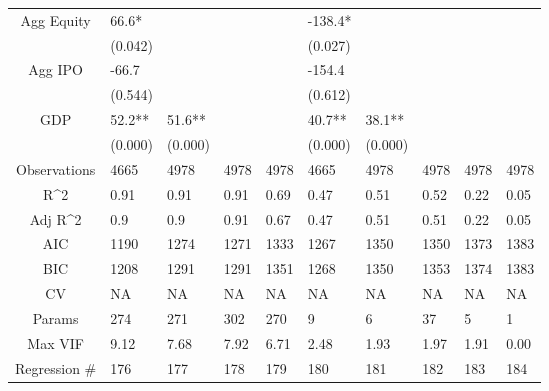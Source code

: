 \documentclass{article}
\begin{document}
\begin{table}[H]
\begin{tabular}{|clllllllll|}
  Agg Equity & 66.6* &  &  &  & -138.4* &  &  &  &  \\
   & (0.042) &  &  &  & (0.027) &  &  &  &  \\
  Agg IPO & -66.7 &  &  &  & -154.4 &  &  &  &  \\
   & (0.544) &  &  &  & (0.612) &  &  &  &  \\
  GDP & 52.2** & 51.6** &  &  & 40.7** & 38.1** &  &  &  \\
   & (0.000) & (0.000) &  &  & (0.000) & (0.000) &  &  &  \\
  \hline
 Observations & 4665 & 4978 & 4978 & 4978 & 4665 & 4978 & 4978 & 4978 & 4978 \\
  R^2 & 0.91 & 0.91 & 0.91 & 0.69 & 0.47 & 0.51 & 0.52 & 0.22 & 0.05 \\
  Adj R^2 & 0.9 & 0.9 & 0.91 & 0.67 & 0.47 & 0.51 & 0.51 & 0.22 & 0.05 \\
  AIC & 1190 & 1274 & 1271 & 1333 & 1267 & 1350 & 1350 & 1373 & 1383 \\
  BIC & 1208 & 1291 & 1291 & 1351 & 1268 & 1350 & 1353 & 1374 & 1383 \\
  CV & NA & NA & NA & NA & NA & NA & NA & NA & NA \\
  Params & 274 & 271 & 302 & 270 & 9 & 6 & 37 & 5 & 1 \\
  Max VIF & 9.12 & 7.68 & 7.92 & 6.71 & 2.48 & 1.93 & 1.97 & 1.91 & 0.00 \\
  Regression \# & 176 & 177 & 178 & 179 & 180 & 181 & 182 & 183 & 184 \\
   \hline
\end{tabular}

\end{table}
\end{document}
